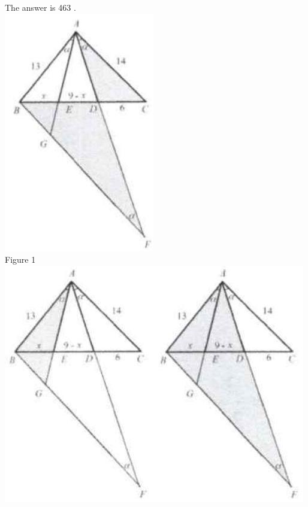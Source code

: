 \documentclass{article}
\begin{document}
The answer is 463 .\\
\centering
\includegraphics[width=\textwidth]{images/121(1).jpg}\\
Figure 1\\
\centering
\includegraphics[width=\textwidth]{images/121(3).jpg}\\
\end{document}
